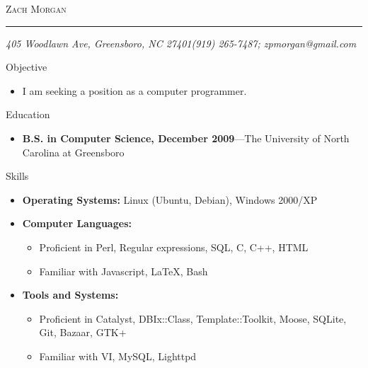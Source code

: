 \documentclass[12pt,oneside]{article}
\makeatletter
\newcommand{\name}{Zach Morgan}
\newcommand{\addr}{405 Woodlawn Ave, Greensboro, NC 27401}
\newcommand{\phone}{(919) 265-7487}
\newcommand{\email}{zpmorgan@gmail.com}
\newcommand{\bigname}[1]{
	\begin{center}\fontfamily{phv}\selectfont\Huge\scshape#1\end{center}
}
\newenvironment{ressection}[1]{
	\vspace{4pt}
	{\fontfamily{phv}\selectfont\Large#1}
	\begin{itemize}
	\vspace{3pt}
}{
	\end{itemize}
}
\newcommand{\resitem}[1]{
	\vspace{-4pt}
	\item \begin{flushleft} #1 \end{flushleft}
}
\newcommand{\ressubitem}[1]{
	\vspace{-1pt}
	\item \begin{flushleft} #1 \end{flushleft}
}
\newcommand{\resbigitem}[3]{
	\vspace{-5pt}
	\item
	\textbf{#1}---#2 \\
	\textit{#3}
}
\newenvironment{ressubsec}[3]{
	\resbigitem{#1}{#2}{#3}
	\vspace{-2pt}
	\begin{itemize}
}{
	\end{itemize}
}
\newenvironment{reslist}[1]{
	\resitem{\textbf{#1}}
	\vspace{-5pt}
	\begin{itemize}
}{
	\end{itemize}
}
\makeatother
\begin{document}
 \selectfont

\bigname{\name}

\vspace{-8pt} \rule{\textwidth}{1pt}

\vspace{-1pt} {\small\itshape \addr \hfill \phone; \email}

\vspace{8 pt}




\begin{ressection}{Objective}

   \resitem{I am seeking a position as a computer programmer.}
	
\end{ressection}


\begin{ressection}{Education}

	\begin{ressubsec}{B.S. in Computer Science, December 2009}{The University of North Carolina at Greensboro}{}
	\end{ressubsec}

\end{ressection}


\begin{ressection}{Skills}

	\resitem{\textbf{Operating Systems:} Linux (Ubuntu, Debian), Windows 2000/XP}

	\begin{reslist}{Computer Languages:}

		\ressubitem{Proficient in Perl, Regular expressions, SQL, C, C++, HTML}

		\ressubitem{Familiar with Javascript, \LaTeX, Bash}

	\end{reslist}

	\begin{reslist}{Tools and Systems:}

		\ressubitem{Proficient in Catalyst, DBIx::Class, Template::Toolkit, Moose, SQLite, Git, Bazaar, GTK+}

		\ressubitem{Familiar with VI, MySQL, Lighttpd}

	\end{reslist}


\end{ressection}
\end{document}
